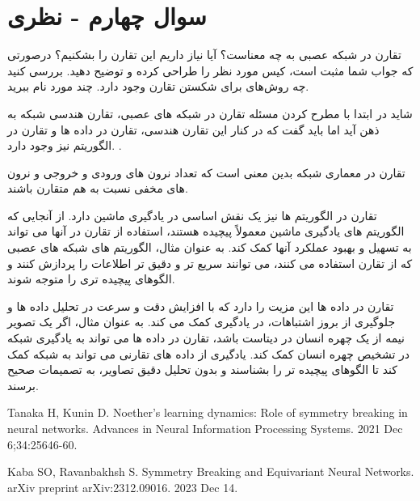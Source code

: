 \section{سوال چهارم - نظری}
تقارن در شبکه عصبی به چه معناست؟ آیا نیاز داریم این تقارن را بشکنیم؟ درصورتی که جواب شما مثبت است، کیس مورد نظر را طراحی کرده و توضیح دهید. بررسی کنید چه روش‌های برای شکستن تقارن وجود دارد. چند مورد نام ببرید.





\begin{qsolve}
 	شاید در ابتدا با مطرح کردن مسئله تقارن در شبکه های عصبی، تقارن هندسی شبکه به ذهن آید اما باید گفت که در کنار این تقارن هندسی، تقارن در داده ها و تقارن در الگوریتم نیز وجود دارد. \cite{ref1}.
 	
 	تقارن در معماری شبکه بدین معنی است که تعداد نرون های ورودی و خروجی و نرون های مخفی نسبت به هم متقارن باشند. 
 	
 	تقارن در الگوریتم ها نیز یک نقش اساسی در یادگیری ماشین دارد. از آنجایی که الگوریتم های یادگیری ماشین معمولاً پیچیده هستند، استفاده از تقارن در آنها می تواند به تسهیل و بهبود عملکرد آنها کمک کند. به عنوان مثال، الگوریتم های شبکه های عصبی که از تقارن استفاده می کنند، می توانند سریع تر و دقیق تر اطلاعات را پردازش کنند و الگوهای پیچیده تری را متوجه شوند.
 	
 	تقارن در داده ها این مزیت را دارد که با افزایش دقت و سرعت در تحلیل داده ها و جلوگیری از بروز اشتباهات، در یادگیری کمک می کند. به عنوان مثال، اگر یک تصویر نیمه از یک چهره انسان در دیتاست باشد، تقارن در داده ها می تواند به یادگیری شبکه در تشخیص چهره انسان کمک کند. یادگیری از داده های تقارنی می تواند به شبکه کمک کند تا الگوهای پیچیده تر را بشناسند و بدون تحلیل دقیق تصاویر، به تصمیمات صحیح برسند.
 	
 	



\end{qsolve}

















\begin{latin}
	\begin{thebibliography}{9}
		Tanaka H, Kunin D. Noether’s learning dynamics: Role of symmetry breaking in neural networks. Advances in Neural Information Processing Systems. 2021 Dec 6;34:25646-60.
		
		Kaba SO, Ravanbakhsh S. Symmetry Breaking and Equivariant Neural Networks. arXiv preprint arXiv:2312.09016. 2023 Dec 14.
	\end{thebibliography} 
\end{latin}